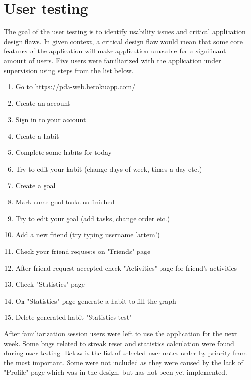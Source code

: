 
\section{User testing}\label{sec:user-testing}

The goal of the user testing is to identify usability issues and critical application design flaws.
In given context, a critical design flaw would mean that some core features of the application
will make application unusable for a significant amount of users.
Five users were familiarized with the application under supervision using steps from the list below.

\begin{enumerate}
    \item Go to https://pda-web.herokuapp.com/
    \item Create an account
    \item Sign in to your account
    \item Create a habit
    \item Complete some habits for today
    \item Try to edit your habit (change days of week, times a day etc.)
    \item Create a goal
    \item Mark some goal tasks as finished
    \item Try to edit your goal (add tasks, change order etc.)
    \item Add a new friend (try typing username 'artem')
    \item Check your friend requests on "Friends" page
    \item After friend request accepted check "Activities" page for friend's activities
    \item Check "Statistics" page
    \item On "Statistics" page generate a habit to fill the graph
    \item Delete generated habit "Statistics test"
\end{enumerate}

After familiarization session users were left to use the application for the next week.
Some bugs related to streak reset and statistics calculation were found during user testing.
Below is the list of selected user notes order by priority from the most important.
Some were not included as they were caused by the lack of "Profile" page which was in the design, but has not been yet implemented.

